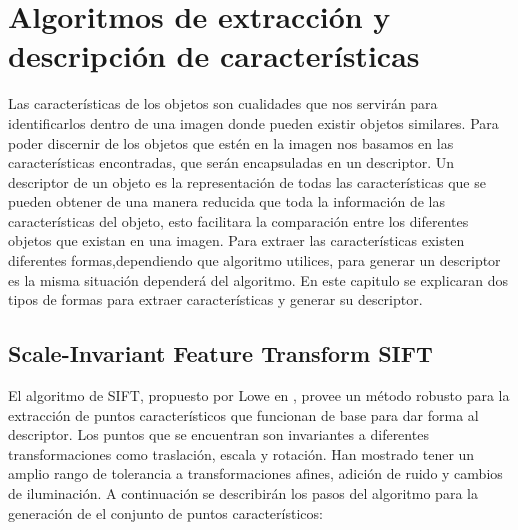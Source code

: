 \chapter{ Algoritmos de extracción y descripción de características}
 
Las características de los objetos son cualidades que nos servirán para identificarlos dentro de una imagen donde pueden existir objetos similares. Para poder discernir de los objetos que estén en la imagen nos basamos en las características encontradas, que serán encapsuladas en un descriptor. Un descriptor de un objeto es la representación de todas las características que se pueden obtener de una manera reducida que toda la información de las características del objeto, esto facilitara la comparación entre los diferentes objetos que existan en una imagen.
Para extraer las características existen diferentes formas,dependiendo que algoritmo utilices, para generar un descriptor es la misma situación dependerá del algoritmo. En este capitulo se explicaran dos tipos de formas para extraer características y generar su descriptor.   

\section{Scale-Invariant Feature Transform SIFT}
	El algoritmo de SIFT, propuesto por Lowe en \cite{Lowe2004},  provee un método robusto para la extracción de puntos característicos que funcionan de base para dar forma al descriptor. Los puntos que se encuentran son invariantes a diferentes transformaciones como traslación, escala y rotación. Han mostrado tener un amplio rango de tolerancia a transformaciones afines, adición de ruido y cambios de iluminación. A continuación se describirán los pasos del algoritmo para la generación de el conjunto de puntos característicos:
\pagebreak

